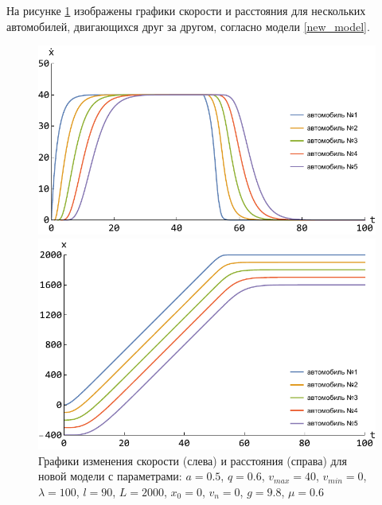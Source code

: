 \documentclass[12pt, a4paper]{extarticle}
\numberwithin{equation}{section}
\numberwithin{figure}{section}
\begin{document}
На рисунке \ref{new_model_picture} изображены графики скорости и расстояния для нескольких автомобилей, двигающихся друг за другом, согласно модели \eqref{new_model}.

\begin{figure}[h!]
	\begin{center}
		\begin{minipage}[h!]{0.48\linewidth}
			\includegraphics[width=1\linewidth,height=0.2\textheight]
			{Images/new_model_speed.pdf}
		\end{minipage}
		\hfill 
		\begin{minipage}[h!]{0.48\linewidth}
			\includegraphics[width=1\linewidth,height=0.2\textheight]
			{Images/new_model_distanse.pdf}
		\end{minipage}
		\caption{Графики изменения скорости (слева) и расстояния (справа) для новой модели с параметрами: $a=0.5$, $q=0.6$, $v_{max}=40$, $v_{min}=0$, $\lambda=100$, $l=90$, $L=2000$, $x_0=0$, $v_n=0$, $g=9.8$, $\mu=0.6$ }
		\label{new_model_picture}
	\end{center}
\end{figure}
\end{document}

